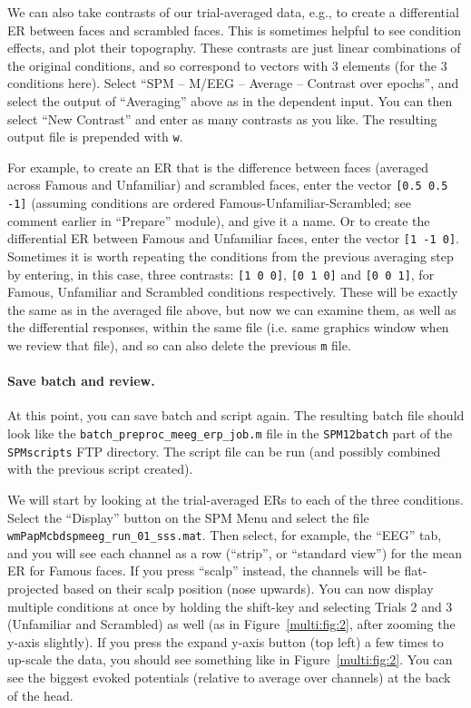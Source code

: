 We can also take contrasts of our trial-averaged data, e.g., to create a differential ER between faces and scrambled faces. This is sometimes helpful to see condition effects, and plot their topography. These contrasts are just linear combinations of the original conditions, and so correspond to vectors with 3 elements (for the 3 conditions here). Select ``SPM -- M/EEG -- Average -- Contrast over epochs'', and select the output of ``Averaging'' above as in the dependent input. You can then select ``New Contrast'' and enter as many contrasts as you like. The resulting output file is prepended with \texttt{w}.

For example, to create an ER that is the difference between faces (averaged across Famous and Unfamiliar) and scrambled faces, enter the vector \verb|[0.5 0.5 -1]| (assuming conditions are ordered Famous-Unfamiliar-Scrambled; see comment earlier in ``Prepare'' module), and give it a name. Or to create the differential ER between Famous and Unfamiliar faces, enter the vector \verb|[1 -1 0]|. Sometimes it is worth repeating the conditions from the previous averaging step by entering, in this case, three contrasts: \verb|[1 0 0]|, \verb|[0 1 0]| and \verb|[0 0 1]|, for Famous, Unfamiliar and Scrambled conditions respectively. These will be exactly the same as in the averaged file above, but now we can examine them, as well as the differential responses, within the same file (i.e. same graphics window when we review that file), and so can also delete the previous \texttt{m} file.

\paragraph{Save batch and review.}

At this point, you can save batch and script again. The resulting batch file should look like the \texttt{batch\_preproc\_meeg\_erp\_job.m} file in the \texttt{SPM12batch} part of the \texttt{SPMscripts} FTP directory. The script file can be run (and possibly combined with the previous script created).

We will start by looking at the trial-averaged ERs to each of the three conditions. Select the ``Display'' button on the SPM Menu and select the file \texttt{wmPapMcbdspmeeg\_run\_01\_sss.mat}. Then select, for example, the ``EEG'' tab, and you will see each channel as a row (``strip'', or ``standard view'') for the mean ER for Famous faces. If you press ``scalp'' instead, the channels will be flat-projected based on their scalp position (nose upwards). You can now display multiple conditions at once by holding the shift-key and selecting Trials 2 and 3 (Unfamiliar and Scrambled) as well (as in Figure~\ref{multi:fig:2}, after zooming the y-axis slightly). If you press the expand y-axis button (top left) a few times to up-scale the data, you should see something like in Figure~\ref{multi:fig:2}. You can see the biggest evoked potentials (relative to average over channels) at the back of the head.

